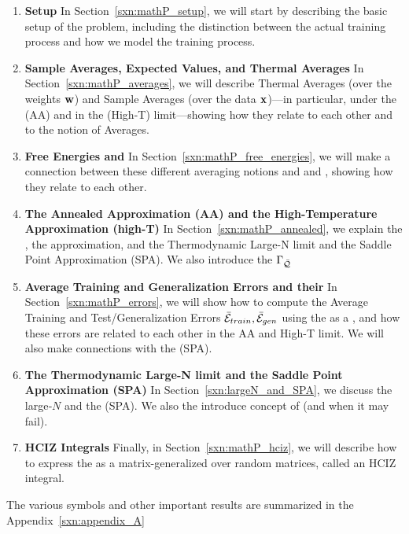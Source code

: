 \begin{enumerate}[label=4.2.\arabic*]
\item
  \textbf{Setup}
  In Section~\ref{sxn:mathP_setup}, 
we will start by describing the basic setup of the problem, including the distinction between the actual training process and how we model the training process.

 \item
  \textbf{Sample Averages, Expected Values, and Thermal Averages}
In Section~\ref{sxn:mathP_averages}, 
we will describe Thermal Averages (over the weights ${\mathbf{w}}$) and Sample Averages (over the data ${\mathbf{x}}$)---in particular, under the \AnnealedApproximation (AA) and in the \HighTemperature (High-T) limit---showing how they relate to each other and to the notion of \Replica Averages.
%
\item
  \textbf{Free Energies and \GeneratingFunctions} 
In Section~\ref{sxn:mathP_free_energies}, 
we will make a connection between these different averaging notions and \FreeEnergies and \GeneratingFunctions, showing how they relate to each other.
%

\item
  \textbf{The Annealed Approximation (AA) and the High-Temperature Approximation (high-T)}
  In Section~\ref{sxn:mathP_annealed}, we explain the \AnnealedApproximation, the \HighTemperature approximation,
  and the Thermodynamic Large-N limit and the Saddle Point Approximation (SPA).
  We also introduce the \Quality \GeneratingFunction $\Gamma_{\bar{\mathcal{Q}}}$
%
  \item
    \textbf{Average Training and Generalization Errors and their \GeneratingFunctions}
  In Section~\ref{sxn:mathP_errors}, we will show how to compute the Average Training and Test/Generalization Errors $\bar{\mathcal{E}}_{train}, \bar{\mathcal{E}}_{gen}$
using the \FreeEnergy as a \GeneratingFunction, and how these errors are related to each other in the AA and High-T limit. 
We will also make connections with the \SaddlePointApproximation (SPA).
%
\item 
  \textbf{The Thermodynamic Large-N limit and the Saddle Point Approximation (SPA)}
  In Section~\ref{sxn:largeN_and_SPA}, we discuss the large‐$N$ \ThermodynamicLimit and the \SaddlePointApproximation (SPA).
  We also the introduce concept of \SelfAveraging (and when it may fail).
%
 \item
  \textbf{HCIZ Integrals}
Finally, in Section~\ref{sxn:mathP_hciz}, we will describe how to express the \FreeEnergy as a matrix-generalized \ThermalAverage over random matrices, called an HCIZ integral.
\end{enumerate}
The various symbols and other important results are summarized in the Appendix~\ref{sxn:appendix_A}


